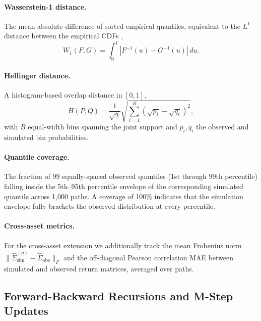 \paragraph{Wasserstein-1 distance.}
The mean absolute difference of sorted empirical quantiles, equivalent to the $L^1$ distance between the empirical CDFs \cite{glasserman2003monte},
\begin{equation}
    W_1(F, G) = \int_0^1 |F^{-1}(u) - G^{-1}(u)|\, du.
    \label{eq:wasserstein}
\end{equation}

\paragraph{Hellinger distance.}
A histogram-based overlap distance in $[0, 1]$,
\begin{equation}
    H(P, Q) = \frac{1}{\sqrt{2}}\sqrt{\sum_{i=1}^{B}\left(\sqrt{p_i} - \sqrt{q_i}\right)^2},
    \label{eq:hellinger}
\end{equation}
with $B$ equal-width bins spanning the joint support and $p_i, q_i$ the observed and simulated bin probabilities.

\paragraph{Quantile coverage.}
The fraction of 99 equally-spaced observed quantiles (1st through 99th percentile) falling inside the 5th--95th percentile envelope of the corresponding simulated quantile across 1{,}000 paths.
A coverage of 100\% indicates that the simulation envelope fully brackets the observed distribution at every percentile.

\paragraph{Cross-asset metrics.}
For the cross-asset extension we additionally track the mean Frobenius norm $\|\hat\Sigma_{\text{sim}}^{(p)} - \hat\Sigma_{\text{obs}}\|_F$ and the off-diagonal Pearson correlation MAE between simulated and observed return matrices, averaged over paths.

\subsection{Forward-Backward Recursions and M-Step Updates}
\label{sec:baum_welch_supp}

